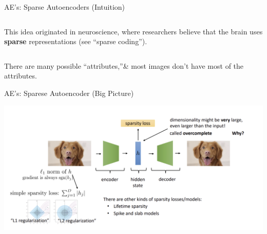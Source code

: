 \documentclass[serif, aspectratio=169]{beamer}
\begin{document}
\begin{frame}{AE’s: Sparse Autoencoders (Intuition)}
\begin{columns}[t]
\begin{column}{0.4\textwidth}
            \begin{tcolorbox}[colback=blue!5, colframe=blue!70!black, boxrule=0.5pt, width=\textwidth, title=\textbf{Aside:}]
                \scriptsize{This idea originated in neuroscience, where researchers believe that the brain uses \textbf{sparse} representations (see “sparse coding”).}
            \end{tcolorbox}
        \end{column}
        
    \end{columns}
        \vspace{0.2cm}
       \scriptsize{There are many possible “attributes,”\& most images don’t have most of the attributes.}

\end{frame}


\begin{frame}{AE's: Sparese Autoencoder (Big Picture)}
    \begin{center}
        \includegraphics[width=\textwidth]{pic/SAE big picture.png}
    \end{center}

\end{frame}
\end{document}
